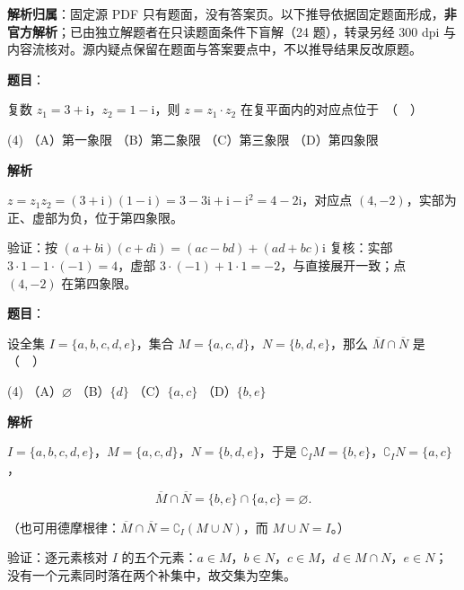 

\begin{gknotice}
\textbf{解析归属}：固定源 PDF 只有题面，没有答案页。以下推导依据固定题面形成，\textbf{非官方解析}；已由独立解题者在只读题面条件下盲解（24 题），转录另经 300 dpi 与内容流核对。源内疑点保留在题面与答案要点中，不以推导结果反改原题。
\end{gknotice}

\begin{answer}

\textbf{题目}：

复数 $z_1 = 3 + \mathrm{i}$，$z_2 = 1 - \mathrm{i}$，则 $z = z_1 \cdot z_2$ 在复平面内的对应点位于　（　）

\begin{gkopts}(4)
\task （A）第一象限
\task （B）第二象限
\task （C）第三象限
\task （D）第四象限
\end{gkopts}

\textbf{解析}

$z=z_1z_2=(3+\mathrm i)(1-\mathrm i)=3-3\mathrm i+\mathrm i-\mathrm i^2=4-2\mathrm i$，对应点 $(4,-2)$，实部为正、虚部为负，位于第四象限。

验证：按 $(a+b\mathrm i)(c+d\mathrm i)=(ac-bd)+(ad+bc)\mathrm i$ 复核：实部 $3\cdot1-1\cdot(-1)=4$，虚部 $3\cdot(-1)+1\cdot1=-2$，与直接展开一致；点 $(4,-2)$ 在第四象限。


\par\medskip

\end{answer}
\begin{answer}

\textbf{题目}：

设全集 $I = \{a, b, c, d, e\}$，集合 $M = \{a, c, d\}$，$N = \{b, d, e\}$，那么 $\overline{M} \cap \overline{N}$ 是　（　）

\begin{gkopts}(4)
\task （A）$\varnothing$
\task （B）$\{d\}$
\task （C）$\{a, c\}$
\task （D）$\{b, e\}$
\end{gkopts}

\textbf{解析}

$I=\{a,b,c,d,e\}$，$M=\{a,c,d\}$，$N=\{b,d,e\}$，于是 $\complement_I M=\{b,e\}$，$\complement_I N=\{a,c\}$，

\nopagebreak[4]
\[\overline M\cap\overline N=\{b,e\}\cap\{a,c\}=\varnothing .\]

（也可用德摩根律：$\overline M\cap\overline N=\complement_I(M\cup N)$，而 $M\cup N=I$。）

验证：逐元素核对 $I$ 的五个元素：$a\in M$，$b\in N$，$c\in M$，$d\in M\cap N$，$e\in N$；没有一个元素同时落在两个补集中，故交集为空集。


\par\medskip

\end{answer}
